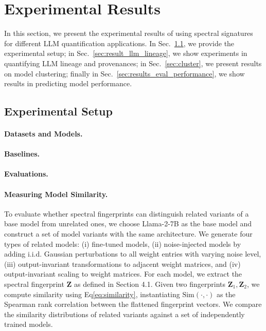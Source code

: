 \section{Experimental Results}\label{sec:results}

In this section, we present the experimental results of using spectral signatures for different LLM quantification applications. In Sec.~\ref{sec:setup}, we provide the experimental setup; in Sec.~\ref{sec:result_llm_lineage}, we show experiments in quantifying LLM lineage and provenances; in Sec.~\ref{sec:cluster}, we present results on model clustering; finally in Sec.~\ref{sec:results_eval_performance}, we show results in predicting model performance.

\subsection{Experimental Setup}\label{sec:setup}


\paragraph{Datasets and Models.} 


\paragraph{Baselines.}



\paragraph{Evaluations.}




\noindent\paragraph{Measuring Model Similarity. }To evaluate whether spectral fingerprints can distinguish related variants of a base model from unrelated ones, we choose Llama-2-7B as the base model and construct a set of model variants with the same architecture. We generate four types of related models: (i) fine-tuned models, (ii) noise-injected models by adding i.i.d. Gaussian perturbations to all weight entries with varying noise level, (iii) output-invariant transformations to adjacent weight matrices, and (iv) output-invariant scaling to weight matrices.  
For each model, we extract the spectral fingerprint $\mathbf{Z}$ as defined in Section 4.1. Given two fingerprints $\mathbf{Z}_1, \mathbf{Z}_2$, we compute similarity using Eq\ref{eq:similarity}, instantiating $\mathrm{Sim}(\cdot,\cdot)$ as the Spearman rank correlation between the flattened fingerprint vectors. We compare the similarity distributions of related variants against a set of independently trained models.

